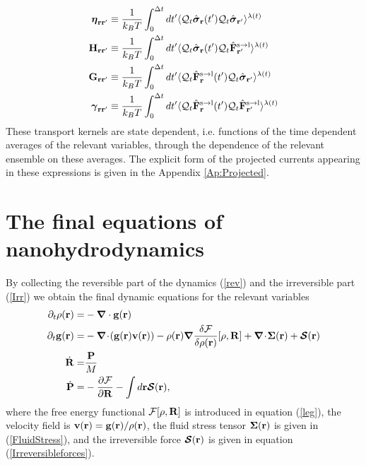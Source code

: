 \documentclass[b5paper,openright,10pt]{book}
\newcommand{\esc}{\!\cdot\!}
\begin{document}
\begin{align}
  \boldsymbol{\eta}_{{\bf  r}{\bf r}'} &\equiv
\frac{1}{k_BT}\int_0^{\Delta t} dt'\langle 
{\cal Q}_t\hat{\boldsymbol{\sigma}}_{{\bf r}}(t')
{\cal Q}_t\hat{\boldsymbol{\sigma}}_{{\bf r}'}\rangle^{\lambda(t)}
\nonumber\\
{\bf H}_{{\bf r}{\bf r}'}&\equiv\frac{1}{k_BT}\int_0^{\Delta t} dt'
\langle {\cal Q}_t\hat{\boldsymbol{\sigma}}_{{\bf r}}(t')
{\cal Q}_t\hat{\bf F}^{\rm s\to l}_{{\bf r}'}\rangle^{\lambda(t)}
\nonumber\\
{\bf G}_{{\bf r}{\bf r}'}&\equiv\frac{1}{k_BT}\int_0^{\Delta t} dt'
\langle {\cal Q}_t\hat{\bf F}^{\rm s\to l}_{{\bf r}}(t')
{\cal Q}_t\hat{\boldsymbol{\sigma}}_{{\bf r}'}\rangle^{\lambda(t)}
\nonumber\\
\boldsymbol{\gamma}_{{\bf  r}{\bf r}'}&\equiv\frac{1}{k_BT}\int_0^{\Delta t} dt'
\langle 
{\cal Q}_t\hat{\bf F}^{\rm s\to l}_{{\bf r}}(t')
{\cal Q}_t\hat{\bf F}^{\rm s\to l}_{{\bf r}'}\rangle^{\lambda(t)}
\label{GK1}
\end{align}
These transport  kernels are state  dependent, i.e.  functions  of the
time  dependent  averages  of  the  relevant  variables,  through  the
dependence of  the relevant ensemble  on these averages.  The explicit
form of the projected currents appearing in these expressions is given
in the Appendix \ref{Ap:Projected}.

\section{The final equations of nanohydrodynamics} 
By collecting the reversible part  of the dynamics (\ref{rev}) and the
irreversible part  (\ref{Irr}) we  obtain the final  dynamic equations
for the relevant variables
\begin{align}
\partial_t\rho({\bf r})=&-\boldsymbol{\nabla}\cdot{\bf g}({\bf r})
\nonumber\\
\partial_t{\bf g}({\bf r})=&-\boldsymbol{\nabla}\esc{\left({\bf g}({\bf r}){\bf v}({\bf r})\right)}
-\rho({\bf r})\boldsymbol{\nabla}\frac{\delta {\cal F}}{\delta\rho({\bf r})}[\rho,{\bf R}]
+\boldsymbol{\nabla}\esc\boldsymbol{\Sigma}({\bf r})+\boldsymbol{{\cal S}}({\bf r})
\nonumber\\
\dot{\bf R}=&\frac{\bf P}{M}
\nonumber\\
\dot{\bf P}=&-\frac{\partial {\cal F}}{\partial {\bf R}}
-\int d {{\bf r}}\boldsymbol{{\cal S}}({\bf r}),
\label{finaleq}
\end{align}
where  the   free  energy  functional  ${\cal   F}[\rho,{\bf  R}]$  is
introduced  in  equation (\ref{leg}),  the  velocity  field is  ${\bf  v}({\bf
  r})={\bf  g}({\bf  r})/\rho({\bf  r})$,   the  fluid  stress  tensor
$\boldsymbol{\Sigma}({\bf  r})$ is  given in  (\ref{FluidStress}), and
the irreversible  force $\boldsymbol{{\cal  S}}({\bf r})$ is  given in
equation (\ref{Irreversibleforces}).
\end{document}
